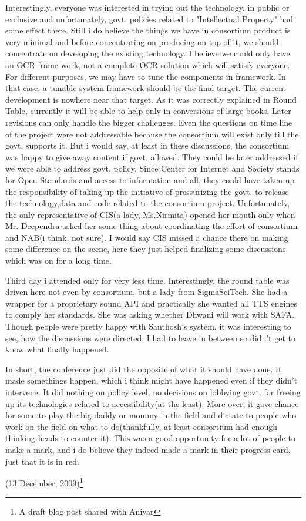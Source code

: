  
Interestingly, everyone was interested in trying out the technology, in public or exclusive and unfortunately, govt. policies related to "Intellectual Property" had some effect there. Still i do believe the things we have in consortium product is very minimal and before concentrating on producing on top of it, we should concentrate on developing the existing technology. I believe we could only have an OCR frame work, not a complete OCR solution which will satisfy everyone. For different purposes, we may have to tune the components in framework. In that case, a tunable system framework should be the final target. The current development is nowhere near that target. As it was correctly explained in Round Table, currently it will be able to help only in conversions of large books. Later revisions can only handle the bigger challenges. Even the questions on time line of the project were not addressable because the consortium will exist only till the govt. supports it. But i would say, at least in these discussions, the consortium was happy to give away content if govt. allowed. They could be later addressed if we were able to address govt. policy. Since Center for Internet and Society stands for Open Standards and access to information and all, they could have taken up the responsibility of taking up the initiative of pressurizing the govt. to release the technology,data and code related to the consortium project. Unfortunately, the only representative of CIS(a lady, Ms.Nirmita) opened her mouth only when Mr. Deependra asked her some thing about coordinating the effort of consortium and NAB(i think, not sure). I would say CIS missed a chance there on making some difference on the scene, here they just helped finalizing some discussions which was on for a long time.

Third day i attended only for very less time. Interestingly, the round table was driven here not even by consortium, but a lady from SigmaSciTech. She had a wrapper for a proprietary sound API and practically she wanted all TTS engines to comply her standards. She was asking whether Dhwani will work with SAFA. Though people were pretty happy with Santhosh's system, it was interesting to see, how the discussions were directed. I had to leave in between so didn't get to know what finally happened. 

In short, the conference just did the opposite of what it should have done. It made somethings happen, which i think might have happened even if they didn't intervene. It did nothing on policy level, no decisions on lobbying govt. for freeing up its technologies related to accessibility(at the least). More over, it gave chance for some to play the big daddy or mommy in the field and dictate to people who work on the field on what to do(thankfully, at least consortium had enough thinking heads to counter it). This was a good opportunity for a lot of people to make a mark, and i do believe they indeed made a mark in their progress card, just that it is in red.
\begin{flushright}(13 December, 2009)\footnote{A draft blog post shared with Anivar}\end{flushright}

\newpage
